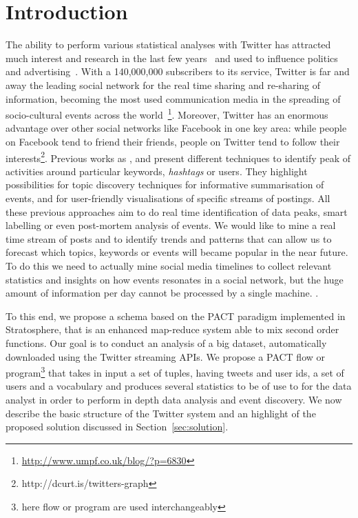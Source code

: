 \section{Introduction}
\label{sec:introduction}
The ability to perform various statistical analyses with Twitter has attracted much interest and research in the last few years~\cite{Hong:2012qy,Lehmann:2012kx} and used to influence politics~\cite{Tumasjan:2010vn} and advertising~\cite{Bakshy:2011ys}. 
With a 140,000,000 subscribers to its service, Twitter is far and away the leading social network for the real time sharing and re-sharing of information, becoming the most used communication media in the spreading of socio-cultural events across the world~\footnote{\url{http://www.umpf.co.uk/blog/?p=6830}}\cite{DBLP:journals:corr:abs-1003-2664}. 
Moreover, Twitter has an enormous advantage over other social networks like Facebook in one key area: while people on Facebook tend to friend their friends, people on Twitter tend to follow their interests\footnote{http://dcurt.is/twitters-graph}.
Previous works as \cite{DBLP:journals:corr:abs-1003-2664}, \cite{Mathioudakis:2010:EOI:1718487.1718525} and \cite{DBLP:conf:chi:MarcusBBKMM11} present different techniques to identify peak of activities around particular keywords, \emph{hashtags} or users.
They highlight possibilities for topic discovery techniques for informative summarisation of events, and for user-friendly visualisations of specific streams of postings.
All these previous approaches aim to do real time identification of data peaks, smart labelling or even post-mortem analysis of events.
We would like to mine a real time stream of posts and to identify trends and patterns that can allow us to forecast which topics, keywords or events will became popular in the near future.
To do this we need to actually mine social media timelines to collect relevant statistics and insights on how events resonates in a social network, but the huge amount of information per day cannot be processed by a single machine. .

To this end, we propose a schema based on the PACT paradigm implemented in Stratosphere, that is an enhanced map-reduce system able to mix second order functions. 
Our goal is to conduct an analysis of a big dataset, automatically downloaded using the Twitter streaming APIs.
We propose a PACT flow or program\footnote{here flow or program are used interchangeably} that takes in input a set of tuples, having tweets and user ids, a set of users and a vocabulary and produces several statistics to be of use to for the data analyst in order to perform in depth data analysis and event discovery. 
We now describe the basic structure of the Twitter system and an highlight of the proposed solution discussed in Section~\ref{sec:solution}. 

